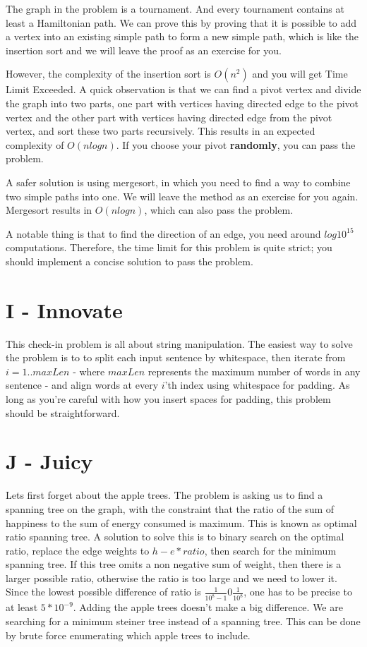 \documentclass{article}
\begin{document}
The graph in the problem is a tournament. And every tournament contains at least a Hamiltonian path. We can prove this by proving that it is possible to add a vertex into an existing simple path to form a new simple path, which is like the insertion sort and we will leave the proof as an exercise for you.

\par
However, the complexity of the insertion sort is $O(n^2)$ and you will get Time Limit Exceeded. A quick observation is that we can find a pivot vertex and divide the graph into two parts, one part with vertices having directed edge to the pivot vertex and the other part with vertices having directed edge from the pivot vertex, and sort these two parts recursively. This results in an expected complexity of $O(nlogn)$. If you choose your pivot \textbf{randomly}, you can pass the problem.

\par
A safer solution is using mergesort, in which you need to find a way to combine two simple paths into one. We will leave the method as an exercise for you again. Mergesort results in $O(nlogn)$, which can also pass the problem.

\par
A notable thing is that to find the direction of an edge, you need around $log10^{15}$ computations. Therefore, the time limit for this problem is quite strict; you should implement a concise solution to pass the problem.

\section*{I - Innovate}
This check-in problem is all about string manipulation. The easiest way to solve the problem is to to split each input sentence by whitespace, then iterate from $i=1..maxLen$ - where $maxLen$ represents the maximum number of words in any sentence - and align words at every $i$'th index using whitespace for padding. As long as you're careful with how you insert spaces for padding, this problem should be straightforward.

\section*{J - Juicy}
Lets first forget about the apple trees. The problem is asking us to find a spanning tree on the graph, with the constraint that the ratio of the sum of happiness to the sum of energy consumed is maximum. This is known as optimal ratio spanning tree. A solution to solve this is to binary search on the optimal ratio, replace the edge weights to $h - e * ratio$, then search for the minimum spanning tree. If this tree omits a non negative sum of weight, then there is a larger possible ratio, otherwise the ratio is too large and we need to lower it. Since the lowest possible difference of ratio is $\frac{1}{10^8 - 1} 0 \frac{1}{10^8}$, one has to be precise to at least $5 * 10^{-9}$. Adding the apple trees doesn't make a big difference. We are searching for a minimum steiner tree instead of a spanning tree. This can be done by brute force enumerating which apple trees to include. 
\end{document}
